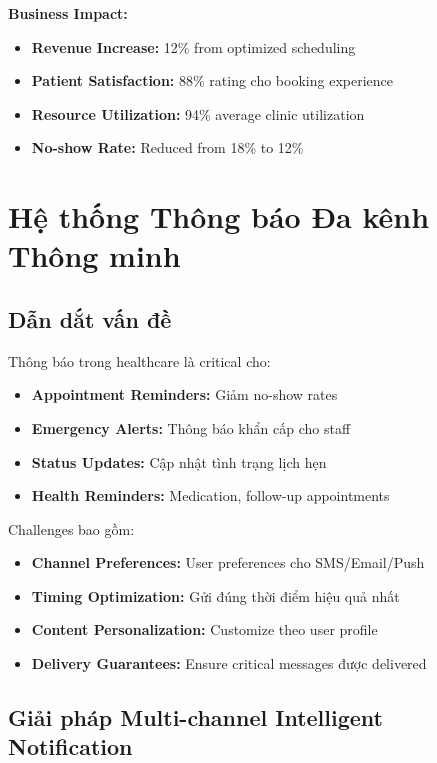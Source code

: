 \documentclass[../DoAn.tex]{subfiles}
\begin{document}
\textbf{Business Impact:}
\begin{itemize}
    \item \textbf{Revenue Increase:} 12\% from optimized scheduling
    \item \textbf{Patient Satisfaction:} 88\% rating cho booking experience
    \item \textbf{Resource Utilization:} 94\% average clinic utilization
    \item \textbf{No-show Rate:} Reduced from 18\% to 12\%
\end{itemize}

\section{Hệ thống Thông báo Đa kênh Thông minh}
\label{section:5.4}

\subsection{Dẫn dắt vấn đề}

Thông báo trong healthcare là critical cho:
\begin{itemize}
    \item \textbf{Appointment Reminders:} Giảm no-show rates
    \item \textbf{Emergency Alerts:} Thông báo khẩn cấp cho staff
    \item \textbf{Status Updates:} Cập nhật tình trạng lịch hẹn
    \item \textbf{Health Reminders:} Medication, follow-up appointments
\end{itemize}

Challenges bao gồm:
\begin{itemize}
    \item \textbf{Channel Preferences:} User preferences cho SMS/Email/Push
    \item \textbf{Timing Optimization:} Gửi đúng thời điểm hiệu quả nhất
    \item \textbf{Content Personalization:} Customize theo user profile
    \item \textbf{Delivery Guarantees:} Ensure critical messages được delivered
\end{itemize}

\subsection{Giải pháp Multi-channel Intelligent Notification}
\end{document}
